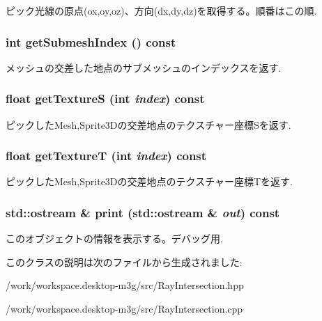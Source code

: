 ピック光線の原点(ox,oy,oz)、方向(dx,dy,dz)を取得する。順番はこの順. \hypertarget{classm3g_1_1RayIntersection_6a11c61d1a1fecc01f2f83463404a6b8}{
\subsubsection[{getSubmeshIndex}]{\setlength{\rightskip}{0pt plus 5cm}int getSubmeshIndex () const}}
\label{classm3g_1_1RayIntersection_6a11c61d1a1fecc01f2f83463404a6b8}


メッシュの交差した地点のサブメッシュのインデックスを返す. \hypertarget{classm3g_1_1RayIntersection_bc14e1d5a83d5fca608b1fbf772614d4}{
\subsubsection[{getTextureS}]{\setlength{\rightskip}{0pt plus 5cm}float getTextureS (int {\em index}) const}}
\label{classm3g_1_1RayIntersection_bc14e1d5a83d5fca608b1fbf772614d4}


ピックしたMesh,Sprite3Dの交差地点のテクスチャー座標Sを返す. \hypertarget{classm3g_1_1RayIntersection_843d5b907bb54a6f28571f0a0f14c932}{
\subsubsection[{getTextureT}]{\setlength{\rightskip}{0pt plus 5cm}float getTextureT (int {\em index}) const}}
\label{classm3g_1_1RayIntersection_843d5b907bb54a6f28571f0a0f14c932}


ピックしたMesh,Sprite3Dの交差地点のテクスチャー座標Tを返す. \hypertarget{classm3g_1_1RayIntersection_6fea17fa1532df3794f8cb39cb4f911f}{
\subsubsection[{print}]{\setlength{\rightskip}{0pt plus 5cm}std::ostream \& print (std::ostream \& {\em out}) const}}
\label{classm3g_1_1RayIntersection_6fea17fa1532df3794f8cb39cb4f911f}


このオブジェクトの情報を表示する。デバッグ用. 

このクラスの説明は次のファイルから生成されました:\begin{CompactItemize}
\item 
/work/workspace.desktop-m3g/src/RayIntersection.hpp\item 
/work/workspace.desktop-m3g/src/RayIntersection.cpp\end{CompactItemize}
